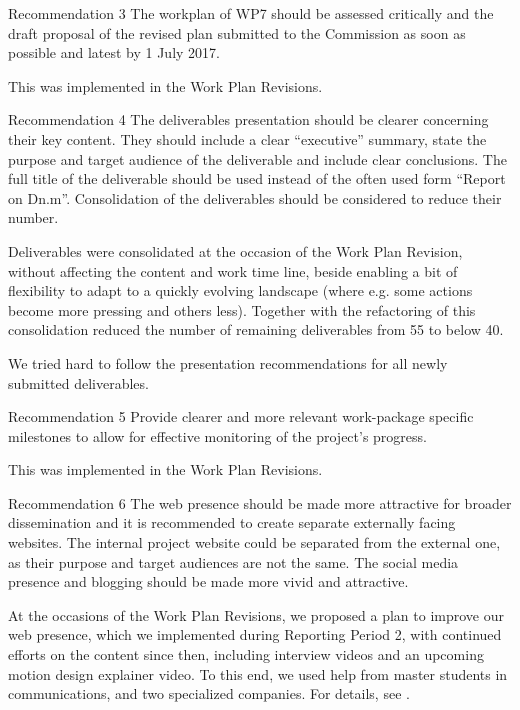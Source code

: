 \begin{recommendation}{Recommendation 3}
  The workplan of WP7 should be assessed critically and the draft
  proposal of the revised plan submitted to the Commission as soon as
  possible and latest by 1 July 2017.
\end{recommendation}

This was implemented in the Work Plan Revisions.

\begin{recommendation}{Recommendation 4}
  The deliverables presentation should be clearer concerning their key
  content. They should include a clear ``executive'' summary, state
  the purpose and target audience of the deliverable and include clear
  conclusions. The full title of the deliverable should be used
  instead of the often used form ``Report on Dn.m''. Consolidation of
  the deliverables should be considered to reduce their number.
\end{recommendation}

Deliverables were consolidated at the occasion of the Work Plan
Revision, without affecting the content and work time line, beside
enabling a bit of flexibility to adapt to a quickly evolving landscape
(where e.g. some actions become more pressing and others less).
Together with the refactoring of  this
consolidation reduced the number of remaining deliverables from 55 to
below 40.

We tried hard to follow the presentation recommendations for all newly
submitted deliverables.

\begin{recommendation}{Recommendation 5}
  Provide clearer and more relevant work-package specific milestones
  to allow for effective monitoring of the project's progress.
\end{recommendation}

This was implemented in the Work Plan Revisions.

\begin{recommendation}{Recommendation 6}
  The web presence should be made more attractive for broader
  dissemination and it is recommended to create separate externally
  facing websites. The internal project website could be separated from
  the external one, as their purpose and target audiences are not the
  same. The social media presence and blogging should be made more
  vivid and attractive.
\end{recommendation}

At the occasions of the Work Plan Revisions, we proposed a plan to
improve our web presence, which we implemented during Reporting Period
2, with continued efforts on the content since then, including
interview videos and an upcoming motion design explainer video. To
this end, we used help from master students in communications, and two
specialized companies. For details, see
.

